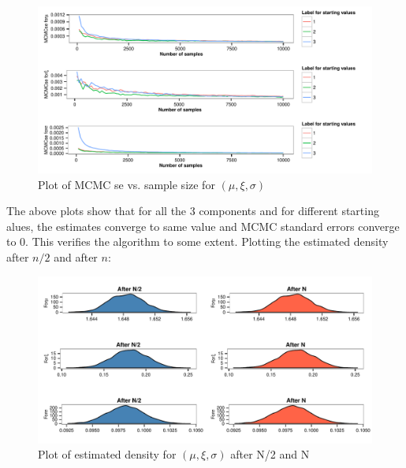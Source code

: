 \documentclass[12pt]{article}
\begin{document}
\begin{enumerate}[label=(\alph*)]
\begin{enumerate}[label=(\roman*)]
\begin{figure}[H]
\begin{centering}
\includegraphics{aua257HW3-006}
\caption{Plot of MCMC se vs. sample size for $(\mu,\xi,\sigma)$}
\end{centering}
\end{figure}
The above plots show that for all the 3 components and for different starting alues, the estimates converge to same value and MCMC standard errors converge to 0. This verifies the algorithm to some extent.
Plotting the estimated density after $n/2$ and after $n$:
\begin{figure}[H]
\begin{centering}
\includegraphics{aua257HW3-007}
\caption{Plot of estimated density for $(\mu,\xi,\sigma)$ after N/2 and N}
\end{centering}
\end{figure}
\clearpage


\end{enumerate}
\end{enumerate}
\end{document}
